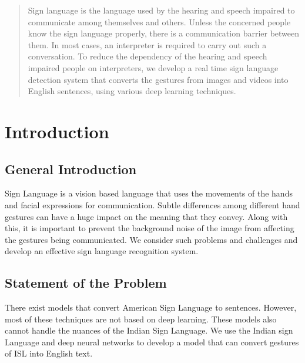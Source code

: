 \documentclass[12pt,oneside,a4paper]{article}
\providecommand\phantomsection{}
\begin{document}
	\null
	\vspace{\fill}

	\phantomsection
	\begin{abstract}
		\normalsize
		\doublespacing
		Sign language is the language used by the hearing and speech impaired to communicate among themselves and others. Unless the concerned people know the sign language properly, there is a communication barrier between them. In most cases, an interpreter is required to carry out such a conversation. To reduce the dependency of the hearing and speech impaired people on interpreters, we develop a real time sign language detection system that converts the gestures from images and videos into English sentences, using various deep learning techniques.
	\end{abstract}

	\vspace{\fill}
	\null
	\newpage

	\tableofcontents
	
	\listoffigures

	\newpage

	\section{Introduction}

		\subsection{General Introduction}
			Sign Language is a vision based language that uses the movements of the hands and facial expressions for communication. Subtle differences among different hand gestures can have a huge impact on the meaning that they convey. Along with this, it is important to prevent the background noise of the image from affecting the gestures being communicated. We consider such problems and challenges and develop an effective sign language recognition system.

		\subsection{Statement of the Problem}
			There exist models that convert American Sign Language to sentences. However, most of these techniques are not based on deep learning. These models also cannot handle the nuances of the Indian Sign Language. We use the Indian sign Language and deep neural networks to develop a model that can convert gestures of ISL into English text.
\end{document}
